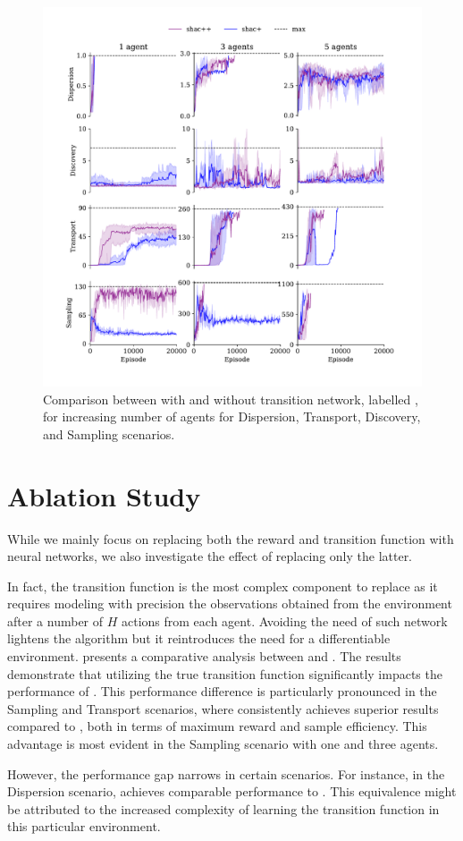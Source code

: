 \begin{figure}[!t]
    \centering
    \includegraphics[width=\textwidth]{figs/ablation-transformer.pdf}
    \caption{Comparison between \fname{} with and without transition network, labelled \fnamer{}, for increasing number of agents for Dispersion, Transport, Discovery, and Sampling scenarios.}
    \label{fig:ablation}
\end{figure}


\section{Ablation Study}\label{apx:ablation}
While we mainly focus on replacing both the reward and transition function with neural networks, we also investigate the effect of replacing only the latter. 

In fact, the transition function is the most complex component to replace as it requires modeling with precision the observations obtained from the environment after a number of $H$ actions from each agent. Avoiding the need of such network lightens the algorithm but it reintroduces the need for a differentiable environment.
 presents a comparative analysis between \fname{} and \fnamer{}. The results demonstrate that utilizing the true transition function significantly impacts the performance of \fname{}. This performance difference is particularly pronounced in the Sampling and Transport scenarios, where \fname{} consistently achieves superior results compared to \fnamer{}, both in terms of maximum reward and sample efficiency. This advantage is most evident in the Sampling scenario with one and three agents.

However, the performance gap narrows in certain scenarios. For instance, in the Dispersion scenario, \fnamer{} achieves comparable performance to \fname{}. This equivalence might be attributed to the increased complexity of learning the transition function in this particular environment.
